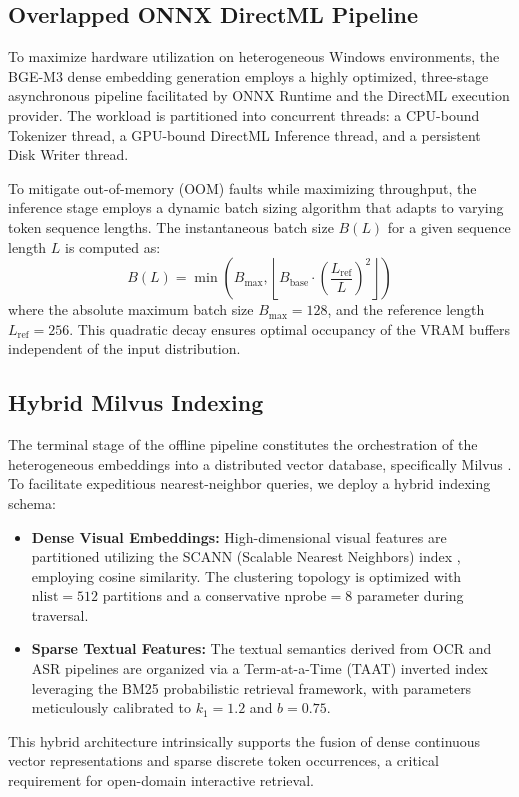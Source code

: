 \subsection{Overlapped ONNX DirectML Pipeline}
To maximize hardware utilization on heterogeneous Windows environments, the BGE-M3 dense embedding generation employs a highly optimized, three-stage asynchronous pipeline facilitated by ONNX Runtime and the DirectML execution provider. The workload is partitioned into concurrent threads: a CPU-bound Tokenizer thread, a GPU-bound DirectML Inference thread, and a persistent Disk Writer thread.

To mitigate out-of-memory (OOM) faults while maximizing throughput, the inference stage employs a dynamic batch sizing algorithm that adapts to varying token sequence lengths. The instantaneous batch size \( B(L) \) for a given sequence length \( L \) is computed as:
\begin{equation}
    B(L) = \min\left(B_{\max}, \left\lfloor B_{\text{base}} \cdot \left(\frac{L_{\text{ref}}}{L}\right)^2 \right\rfloor\right)
\end{equation}
where the absolute maximum batch size \( B_{\max} = 128 \), and the reference length \( L_{\text{ref}} = 256 \). This quadratic decay ensures optimal occupancy of the VRAM buffers independent of the input distribution.

\subsection{Hybrid Milvus Indexing}
The terminal stage of the offline pipeline constitutes the orchestration of the heterogeneous embeddings into a distributed vector database, specifically Milvus \cite{wang2021milvus}. To facilitate expeditious nearest-neighbor queries, we deploy a hybrid indexing schema:
\begin{itemize}
    \item \textbf{Dense Visual Embeddings:} High-dimensional visual features are partitioned utilizing the SCANN (Scalable Nearest Neighbors) index \cite{guo2020accelerating}, employing cosine similarity. The clustering topology is optimized with \( \text{nlist} = 512 \) partitions and a conservative \( \text{nprobe} = 8 \) parameter during traversal.
    \item \textbf{Sparse Textual Features:} The textual semantics derived from OCR and ASR pipelines are organized via a Term-at-a-Time (TAAT) inverted index leveraging the BM25 probabilistic retrieval framework, with parameters meticulously calibrated to \( k_1 = 1.2 \) and \( b = 0.75 \).
\end{itemize}
This hybrid architecture intrinsically supports the fusion of dense continuous vector representations and sparse discrete token occurrences, a critical requirement for open-domain interactive retrieval.
